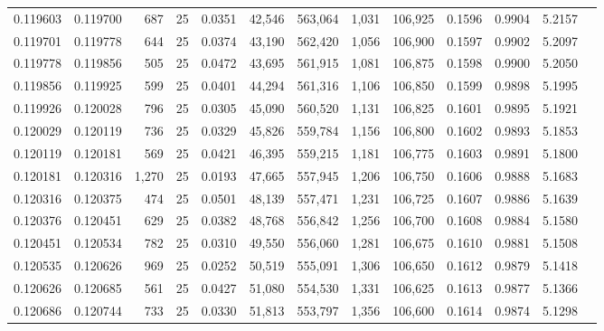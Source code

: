 \begin{tabular}{rrrrrrrrrrrrr}
0.119603 & 0.119700 &   687 &  25 &                                     0.0351 &  42,546 & 563,064 &   1,031 & 106,925 & 0.1596 & 0.9904 & 5.2157 \\
0.119701 & 0.119778 &   644 &  25 &                                     0.0374 &  43,190 & 562,420 &   1,056 & 106,900 & 0.1597 & 0.9902 & 5.2097 \\
0.119778 & 0.119856 &   505 &  25 &                                     0.0472 &  43,695 & 561,915 &   1,081 & 106,875 & 0.1598 & 0.9900 & 5.2050 \\
0.119856 & 0.119925 &   599 &  25 &                                     0.0401 &  44,294 & 561,316 &   1,106 & 106,850 & 0.1599 & 0.9898 & 5.1995 \\
0.119926 & 0.120028 &   796 &  25 &                                     0.0305 &  45,090 & 560,520 &   1,131 & 106,825 & 0.1601 & 0.9895 & 5.1921 \\
0.120029 & 0.120119 &   736 &  25 &                                     0.0329 &  45,826 & 559,784 &   1,156 & 106,800 & 0.1602 & 0.9893 & 5.1853 \\
0.120119 & 0.120181 &   569 &  25 &                                     0.0421 &  46,395 & 559,215 &   1,181 & 106,775 & 0.1603 & 0.9891 & 5.1800 \\
0.120181 & 0.120316 & 1,270 &  25 &                                     0.0193 &  47,665 & 557,945 &   1,206 & 106,750 & 0.1606 & 0.9888 & 5.1683 \\
0.120316 & 0.120375 &   474 &  25 &                                     0.0501 &  48,139 & 557,471 &   1,231 & 106,725 & 0.1607 & 0.9886 & 5.1639 \\
0.120376 & 0.120451 &   629 &  25 &                                     0.0382 &  48,768 & 556,842 &   1,256 & 106,700 & 0.1608 & 0.9884 & 5.1580 \\
0.120451 & 0.120534 &   782 &  25 &                                     0.0310 &  49,550 & 556,060 &   1,281 & 106,675 & 0.1610 & 0.9881 & 5.1508 \\
0.120535 & 0.120626 &   969 &  25 &                                     0.0252 &  50,519 & 555,091 &   1,306 & 106,650 & 0.1612 & 0.9879 & 5.1418 \\
0.120626 & 0.120685 &   561 &  25 &                                     0.0427 &  51,080 & 554,530 &   1,331 & 106,625 & 0.1613 & 0.9877 & 5.1366 \\
0.120686 & 0.120744 &   733 &  25 &                                     0.0330 &  51,813 & 553,797 &   1,356 & 106,600 & 0.1614 & 0.9874 & 5.1298 \\

\end{tabular}
